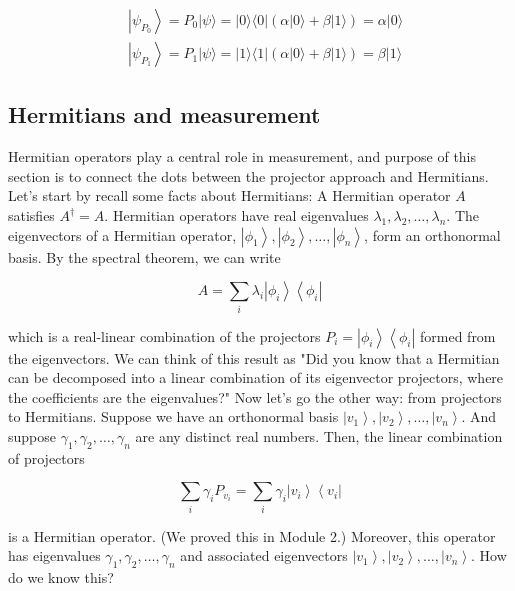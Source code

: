 \documentclass[main.tex]{subfiles}
\begin{document}
    $$
    \begin{aligned}
    &\left|\psi_{P_{0}}\right\rangle=P_{0}|\psi\rangle=|0\rangle\langle 0|(\alpha|0\rangle+\beta|1\rangle)=\alpha| 0\rangle \\
    &\left|\psi_{P_{1}}\right\rangle=P_{1}|\psi\rangle=|1\rangle\langle 1|(\alpha|0\rangle+\beta|1\rangle)=\beta| 1\rangle
    \end{aligned}
    $$

\subsection{Hermitians and measurement}

    Hermitian operators play a central role in measurement, and purpose of this section is to connect the dots between the projector approach and Hermitians. Let's start by recall some facts about Hermitians: A Hermitian operator $A$ satisfies $A^{\dagger}=A$. Hermitian operators have real eigenvalues $\lambda_{1}, \lambda_{2}, \ldots, \lambda_{n}$. The eigenvectors of a Hermitian operator, $\left|\phi_{1}\right\rangle,\left|\phi_{2}\right\rangle, \ldots,\left|\phi_{n}\right\rangle$, form an orthonormal basis. By the spectral theorem, we can write
    
    $$
    A=\sum_{i} \lambda_{i}\left|\phi_{i}\right\rangle\left\langle\phi_{i}\right|
    $$
    
    which is a real-linear combination of the projectors $P_{i}=\left|\phi_{i}\right\rangle\left\langle\phi_{i}\right|$ formed from the eigenvectors. We can think of this result as "Did you know that a Hermitian can be decomposed into a linear combination of its eigenvector projectors, where the coefficients are the eigenvalues?" Now let's go the other way: from projectors to Hermitians. Suppose we have an orthonormal basis $\left|v_{1}\right\rangle,\left|v_{2}\right\rangle, \ldots,\left|v_{n}\right\rangle$. And suppose $\gamma_{1}, \gamma_{2}, \ldots, \gamma_{n}$ are any distinct real numbers. Then, the linear combination of projectors
    
    $$
    \sum_{i} \gamma_{i} P_{v_{i}}=\sum_{i} \gamma_{i}\left|v_{i}\right\rangle\left\langle v_{i}\right|
    $$
    
    is a Hermitian operator. (We proved this in Module 2.) Moreover, this operator has eigenvalues $\gamma_{1}, \gamma_{2}, \ldots, \gamma_{n}$ and associated eigenvectors $\left|v_{1}\right\rangle,\left|v_{2}\right\rangle, \ldots,\left|v_{n}\right\rangle$. How do we know this?
    
\end{document}
